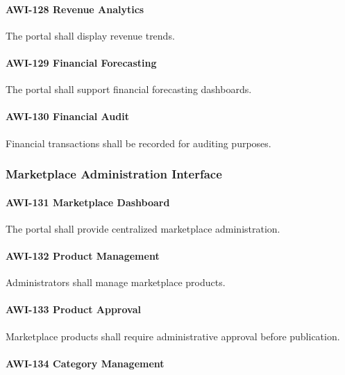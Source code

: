 \paragraph{AWI-128 Revenue Analytics}

The portal shall display revenue trends.

\paragraph{AWI-129 Financial Forecasting}

The portal shall support financial forecasting dashboards.

\paragraph{AWI-130 Financial Audit}

Financial transactions shall be recorded for auditing purposes.


\subsubsection*{Marketplace Administration Interface}

\paragraph{AWI-131 Marketplace Dashboard}

The portal shall provide centralized marketplace administration.

\paragraph{AWI-132 Product Management}

Administrators shall manage marketplace products.

\paragraph{AWI-133 Product Approval}

Marketplace products shall require administrative approval before
publication.

\paragraph{AWI-134 Category Management}

